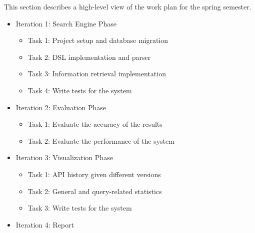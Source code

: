 This section describes a high-level view of the work plan for the spring semester.

\begin{itemize}
    \item Iteration 1: Search Engine Phase
    \begin{itemize}
        \item Task 1: Project setup and database migration
        \item Task 2: DSL implementation and parser
        \item Task 3: Information retrieval implementation
        \item Task 4: Write tests for the system
    \end{itemize}
    \item Iteration 2: Evaluation Phase
    \begin{itemize}
        \item Task 1: Evaluate the accuracy of the results
        \item Task 2: Evaluate the performance of the system
    \end{itemize}
    \item Iteration 3: Visualization Phase
    \begin{itemize}
        \item Task 1: API history given different versions
        \item Task 2: General and query-related statistics
        \item Task 3: Write tests for the system
    \end{itemize}
    \item Iteration 4: Report
\end{itemize}
